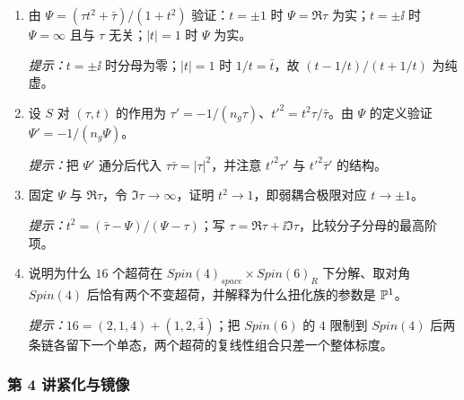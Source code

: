 \begin{enumerate}[label=\arabic*.,start=9,leftmargin=2.4em,itemsep=6pt]
\item 由 $\Psi=(\tau t^2+\bar\tau)/(1+t^2)$ 验证：$t=\pm1$ 时 $\Psi=\Re\tau$ 为实；$t=\pm\ii$ 时 $\Psi=\infty$ 且与 $\tau$ 无关；$|t|=1$ 时 $\Psi$ 为实。
\par\smallskip\noindent\emph{提示：}$t=\pm\ii$ 时分母为零；$|t|=1$ 时 $1/t=\bar t$，故 $(t-1/t)/(t+1/t)$ 为纯虚。

\item 设 $S$ 对 $(\tau,t)$ 的作用为 $\tau'=-1/(n_g\tau)$、$t'^2=t^2\tau/\bar\tau$。由 $\Psi$ 的定义验证 $\Psi'=-1/(n_g\Psi)$。
\par\smallskip\noindent\emph{提示：}把 $\Psi'$ 通分后代入 $\tau\bar\tau=|\tau|^2$，并注意 $t'^2\tau'$ 与 $t'^2\bar\tau'$ 的结构。

\item 固定 $\Psi$ 与 $\Re\tau$，令 $\Im\tau\to\infty$，证明 $t^2\to1$，即弱耦合极限对应 $t\to\pm1$。
\par\smallskip\noindent\emph{提示：}$t^2=(\bar\tau-\Psi)/(\Psi-\tau)$；写 $\tau=\Re\tau+\ii\Im\tau$，比较分子分母的最高阶项。

\item 说明为什么 $16$ 个超荷在 $Spin(4)_{space}\times Spin(6)_R$ 下分解、取对角 $Spin(4)$ 后恰有两个不变超荷，并解释为什么扭化族的参数是 $\mathbb{P}^1$。
\par\smallskip\noindent\emph{提示：}$16=(2,1,4)+(1,2,\bar4)$；把 $Spin(6)$ 的 $4$ 限制到 $Spin(4)$ 后两条链各留下一个单态，两个超荷的复线性组合只差一个整体标度。
\end{enumerate}

\subsubsection*{第 4 讲\quad 紧化与镜像}

